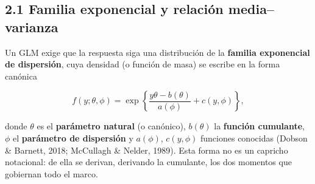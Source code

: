 \documentclass[
  letterpaper,
  DIV=11,
  numbers=noendperiod]{scrartcl}
\begin{document}
\hypertarget{sec-u12-familia}{%
\subsection{2.1 Familia exponencial y relación
media--varianza}\label{sec-u12-familia}}

Un GLM exige que la respuesta siga una distribución de la
\textbf{familia exponencial de dispersión}, cuya densidad (o función de
masa) se escribe en la forma canónica

\[
f(y;\theta,\phi)=\exp\!\left\{\frac{y\theta-b(\theta)}{a(\phi)}+c(y,\phi)\right\},
\]

donde \(\theta\) es el \textbf{parámetro natural} (o canónico),
\(b(\theta)\) la \textbf{función cumulante}, \(\phi\) el
\textbf{parámetro de dispersión} y \(a(\phi)\), \(c(y,\phi)\) funciones
conocidas (Dobson \& Barnett, 2018; McCullagh \& Nelder, 1989). Esta
forma no es un capricho notacional: de ella se derivan, derivando la
cumulante, los dos momentos que gobiernan todo el marco.
\end{document}
